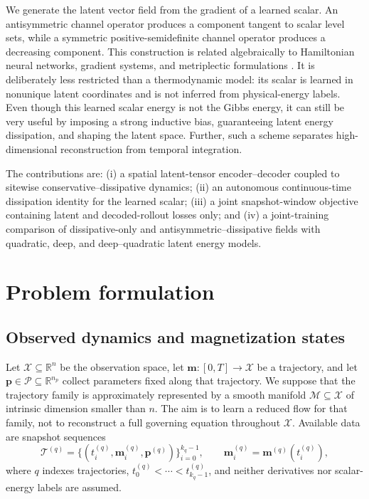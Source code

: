 \documentclass[a4paper,11pt]{article}
\newcommand{\R}{\mathbb{R}}
\newcommand{\m}{\bm m}
\newcommand{\p}{\bm p}
\begin{document}
We generate the latent vector field from the gradient of a learned scalar. An antisymmetric channel operator produces a component tangent to scalar level sets, while a symmetric positive-semidefinite channel operator produces a decreasing component. This construction is related algebraically to Hamiltonian neural networks, gradient systems, and metriplectic formulations \cite{greydanus2019hamiltonian,morrison1986paradigm,hernandez2023port}. It is deliberately less restricted than a thermodynamic model: its scalar is learned in nonunique latent coordinates and is not inferred from physical-energy labels.
Even though this learned scalar energy is not the Gibbs energy, it can still be very useful by imposing a strong inductive bias, guaranteeing latent energy dissipation, and shaping the latent space. Further, such a scheme separates high-dimensional reconstruction from temporal integration. 

The contributions are: (i) a spatial latent-tensor encoder--decoder coupled to sitewise conservative--dissipative dynamics; (ii) an autonomous continuous-time dissipation identity for the learned scalar; (iii) a joint snapshot-window objective containing latent and decoded-rollout losses only; and (iv) a joint-training comparison of dissipative-only and antisymmetric--dissipative fields with quadratic, deep, and deep--quadratic latent energy models.

\section{Problem formulation}
\subsection{Observed dynamics and magnetization states}
Let $\mathcal X\subseteq\R^n$ be the observation space, let $\m:[0,T]\to\mathcal X$ be a trajectory, and let $\p\in\mathcal P\subseteq\R^{n_p}$ collect parameters fixed along that trajectory. We suppose that the trajectory family is approximately represented by a smooth manifold $\mathcal M\subseteq\mathcal X$ of intrinsic dimension smaller than $n$. The aim is to learn a reduced flow for that family, not to reconstruct a full governing equation throughout $\mathcal X$. Available data are snapshot sequences
\begin{equation}
 \mathcal T^{(q)}=\{(t_i^{(q)},\m_i^{(q)},\p^{(q)})\}_{i=0}^{k_q-1},\qquad
 \m_i^{(q)}=\m^{(q)}(t_i^{(q)}),
 \label{eq:data}
\end{equation}
where $q$ indexes trajectories, $t_0^{(q)}<\cdots<t_{k_q-1}^{(q)}$, and neither derivatives nor scalar-energy labels are assumed.
\end{document}

